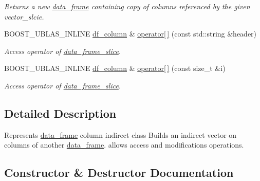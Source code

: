 \begin{DoxyCompactItemize}
\begin{DoxyCompactList}\small\item\em Returns a new \hyperlink{classboost_1_1numeric_1_1ublas_1_1data__frame}{data\+\_\+frame} containing copy of columns referenced by the given vector\+\_\+slcie. \end{DoxyCompactList}\item 
B\+O\+O\+S\+T\+\_\+\+U\+B\+L\+A\+S\+\_\+\+I\+N\+L\+I\+NE \hyperlink{classboost_1_1numeric_1_1ublas_1_1df__column}{df\+\_\+column} \& \hyperlink{classboost_1_1numeric_1_1ublas_1_1data__frame__indirect_a1e017caef11a8db5abc366e840ce41a8}{operator\mbox{[}$\,$\mbox{]}} (const std\+::string \&header)
\begin{DoxyCompactList}\small\item\em Access operator of \hyperlink{classboost_1_1numeric_1_1ublas_1_1data__frame__slice}{data\+\_\+frame\+\_\+slice}. \end{DoxyCompactList}\item 
B\+O\+O\+S\+T\+\_\+\+U\+B\+L\+A\+S\+\_\+\+I\+N\+L\+I\+NE \hyperlink{classboost_1_1numeric_1_1ublas_1_1df__column}{df\+\_\+column} \& \hyperlink{classboost_1_1numeric_1_1ublas_1_1data__frame__indirect_aaaa0256741fd9e5401120277c0185b58}{operator\mbox{[}$\,$\mbox{]}} (const size\+\_\+t \&i)
\begin{DoxyCompactList}\small\item\em Access operator of \hyperlink{classboost_1_1numeric_1_1ublas_1_1data__frame__slice}{data\+\_\+frame\+\_\+slice}. \end{DoxyCompactList}\end{DoxyCompactItemize}


\subsection{Detailed Description}
Represents \hyperlink{classboost_1_1numeric_1_1ublas_1_1data__frame}{data\+\_\+frame} column indirect class Builds an indirect vector on columns of another \hyperlink{classboost_1_1numeric_1_1ublas_1_1data__frame}{data\+\_\+frame}. allows access and modifications operations. 

\subsection{Constructor \& Destructor Documentation}
